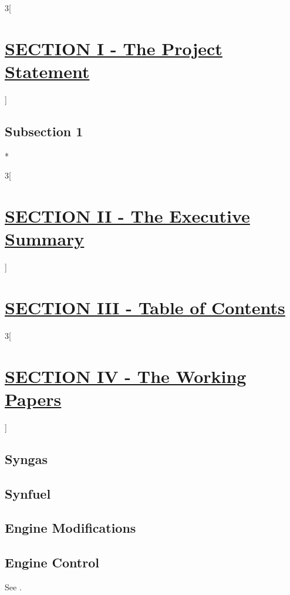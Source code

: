 \documentclass[11pt,a4paper,numbers=noenddot]{scrartcl}
\begin{document}


\begin{paracol}{3}[\section{\underline{SECTION I - The Project Statement}}]
	\switchcolumn[0]
	\subsection{Subsection 1}\label{subsec:first}
	\switchcolumn[1]
	\lipsum[1]
	
	\switchcolumn[1]*
	\lipsum[2]
\end{paracol}

\begin{paracol}{3}[\section{\underline{SECTION II - The Executive Summary}}]

\end{paracol}

\newpage
\section{\underline{SECTION III - Table of Contents}}
\tableofcontents
	
\newpage
\begin{paracol}{3}[\section{\underline{SECTION IV - The Working Papers}}]
	\switchcolumn[0]
	\subsection{Syngas}\label{subsec:WP_syngas}
	\switchcolumn[1]
	\switchcolumn[0]
	\subsection{Synfuel}\label{subsec:WP_synfuel}
	\switchcolumn[1]
	\switchcolumn[0]
	\subsection{Engine Modifications}\label{subsec:WP_enginemod}
	\switchcolumn[1]
	\switchcolumn[0]
	\subsection{Engine Control}\label{subsec:WP_engineControl}
	See \autocite{kiencke2005}.
	\switchcolumn[1]
\end{paracol}
\end{document}

